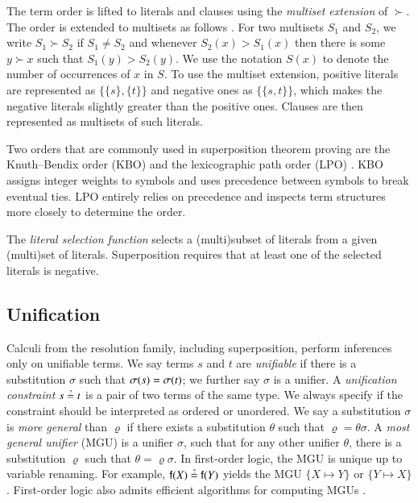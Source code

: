 The term order is lifted to literals and clauses using the {\em multiset extension} of
$\succ$. The order is extended to multisets as follows
\cite[Sect.~2.5]{bg-01-resolution}. For two multisets $S_1$ and $S_2$, we write $S_1 \succ S_2$ if $S_1 \not= S_2$
and whenever $S_2(x) > S_1(x)$ then there is some $y \succ x$ such that $S_1(y)
> S_2(y)$. We use the notation $S(x)$ to denote the number of occurrences of $x$ in
$S$. To use the  multiset extension, positive literals are represented as $ \{ \{s\},
\{t\} \}$ and negative ones as $\{ \{ s, t \} \}$, which makes the negative literals slightly greater than the positive ones.
Clauses are then represented as 
multisets of such literals. 

Two orders that are commonly used in superposition theorem proving are the
Knuth--Bendix order (KBO) \cite[Sect.~5.4.4]{bn-98-tr-and-all-that} and the
lexicographic path order (LPO) \cite[Sect.~5.4.2]{bn-98-tr-and-all-that}.
KBO assigns integer weights to symbols and uses precedence between symbols to
break eventual ties. LPO entirely relies on precedence and inspects term
structures more closely to determine the order. 

\newcommand{\selfun}{\ensuremath{\mathit{Sel}}}
The {\em literal selection function} selects a (multi)subset of literals
from a given (multi)set of literals. Superposition requires that at least one of the selected literals is negative.
\pagebreak[2] 

\subsection{Unification}
\label{sec:pre:unif}

Calculi from the resolution family, including superposition, perform inferences
only on unifiable terms. We say terms $s$ and $t$ are {\em unifiable} if there is a
substitution $\sigma$ such that $\sigma(s) = \sigma(t)$; we further say
$\sigma$ is a unifier. A \emph{unification constraint} $s \unif t$ is a pair of two terms of the same type. 
We always specify if the constraint should be interpreted as ordered or unordered.
We say a substitution $\sigma$ is \emph{more general} than $\varrho$ if there exists a substitution $\theta$
such that $\varrho = \theta\sigma$.
A \emph{most general unifier} ({MGU}) is a
unifier $\sigma$, such that for any other unifier $\theta$, there is a
substitution $\varrho$ such that $\theta = \varrho\sigma$. In first-order logic,
the MGU is unique up to variable renaming. For example, $\cst{f}(X) \unif \cst{f}(Y)$ yields the MGU 
$\{ X \mapsto Y\}$ or  $\{ Y \mapsto X \}$. First-order logic also admits efficient algorithms for computing MGUs \cite{hv-09-unifalgs}.

